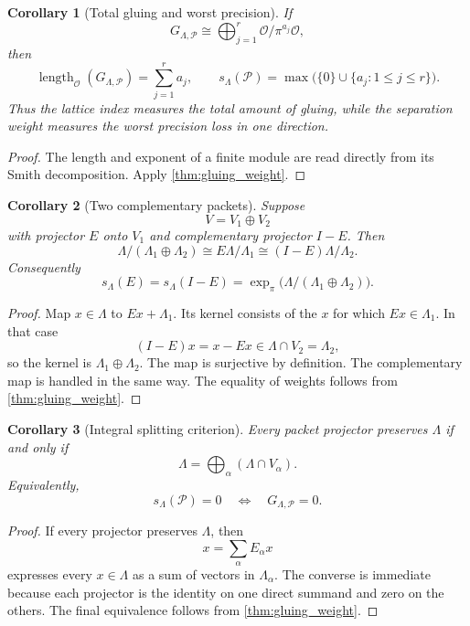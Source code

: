 \documentclass[11pt,a4paper]{article}
\newtheorem{corollary}[corollary]{Corollary}
\theoremstyle{definition}
\theoremstyle{remark}
\newcommand{\OO}{\mathcal O}
\newcommand{\Pcal}{\mathcal P}
\newcommand{\length}{\operatorname{length}}
\newcommand{\expn}{\operatorname{exp}}
\providecommand{\OO}{\mathcal O}
\theoremstyle{definition}\newtheorem{construction}[theorem]{Construction}\newtheorem{certificate}[theorem]{Numerical Certificate}
\theoremstyle{remark}\newtheorem{boundary}[theorem]{Boundary}
\begin{document}
\begin{corollary}[Total gluing and worst precision]\label{cor:length_and_weight}
If
\[
G_{\Lambda,\Pcal}
\cong
\bigoplus_{j=1}^r\OO/\pi^{a_j}\OO,
\]
then
\[
\length_{\OO}(G_{\Lambda,\Pcal})
=
\sum_{j=1}^ra_j,
\qquad
s_\Lambda(\Pcal)=\max\bigl(\{0\}\cup\{a_j:1\leq j\leq r\}\bigr).
\]
Thus the lattice index measures the total amount of gluing, while the separation weight measures the worst precision loss in one direction.
\end{corollary}

\begin{proof}
The length and exponent of a finite module are read directly from its Smith decomposition.  Apply \cref{thm:gluing_weight}.
\end{proof}

\begin{corollary}[Two complementary packets]\label{cor:binary_gluing}
Suppose
\[
V=V_1\oplus V_2
\]
with projector $E$ onto $V_1$ and complementary projector $I-E$.  Then
\[
\Lambda/(\Lambda_1\oplus\Lambda_2)
\cong
E\Lambda/\Lambda_1
\cong
(I-E)\Lambda/\Lambda_2.
\]
Consequently
\[
s_\Lambda(E)=s_\Lambda(I-E)
=
\expn_\pi\bigl(\Lambda/(\Lambda_1\oplus\Lambda_2)\bigr).
\]
\end{corollary}

\begin{proof}
Map $x\in\Lambda$ to $Ex+\Lambda_1$.  Its kernel consists of the $x$ for which $Ex\in\Lambda_1$.  In that case
\[
(I-E)x=x-Ex\in\Lambda\cap V_2=\Lambda_2,
\]
so the kernel is $\Lambda_1\oplus\Lambda_2$.  The map is surjective by definition.  The complementary map is handled in the same way.  The equality of weights follows from \cref{thm:gluing_weight}.
\end{proof}

\begin{corollary}[Integral splitting criterion]\label{cor:integral_split}
Every packet projector preserves $\Lambda$ if and only if
\[
\Lambda=\bigoplus_\alpha(\Lambda\cap V_\alpha).
\]
Equivalently,
\[
s_\Lambda(\Pcal)=0
\quad\Longleftrightarrow\quad
G_{\Lambda,\Pcal}=0.
\]
\end{corollary}

\begin{proof}
If every projector preserves $\Lambda$, then
\[
x=\sum_\alpha E_\alpha x
\]
expresses every $x\in\Lambda$ as a sum of vectors in $\Lambda_\alpha$.  The converse is immediate because each projector is the identity on one direct summand and zero on the others.  The final equivalence follows from \cref{thm:gluing_weight}.
\end{proof}
\end{document}
